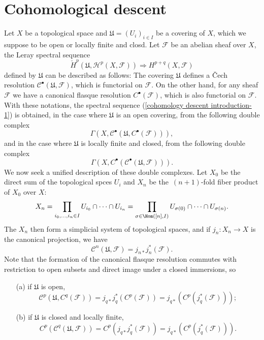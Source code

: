 \section{Cohomological descent}
Let $X$ be a topological space and $\mathfrak{U}=(U_i)_{i\in I}$ be a covering of $X$, which we suppose to be open or locally finite and closd. Let $\mathscr{F}$ be an abelian sheaf over $X$, the Leray spectral sequence
\begin{equation}\label{cohomology descent introduction-1}
\check{H}^p(\mathfrak{U},\mathcal{H}^p(X,\mathscr{F}))\Rightarrow H^{p+q}(X,\mathscr{F})
\end{equation}
defined by $\mathfrak{U}$ can be described as follows: The covering $\mathfrak{U}$ defines a \v{C}ech resolution $\mathscr{C}^\bullet(\mathfrak{U},\mathscr{F})$, which is functorial on $\mathscr{F}$. On the other hand, for any sheaf $\mathscr{F}$ we have a canonical flasque resolution $C^\bullet(\mathscr{F})$, which is also functorial on $\mathscr{F}$. With these notations, the spectral sequence (\ref{cohomology descent introduction-1}) is obtained, in the case where $\mathfrak{U}$ is an open covering, from the following double complex
\[\Gamma(X,\mathscr{C}^\bullet(\mathfrak{U},C^\bullet(\mathscr{F}))),\]
and in the case where $\mathfrak{U}$ is locally finite and closed, from the following double complex
\[\Gamma(X,C^\bullet(\mathscr{C}^\bullet(\mathfrak{U},\mathscr{F}))).\]
We now seek a unified description of these double complexes. Let $X_0$ be the direct sum of the topological spces $U_i$ and $X_n$ be the~$(n+1)$-fold fiber product of $X_0$ over $X$:
\begin{equation}\label{cohomology descent introduction-2}
X_n=\prod_{i_0,\dots,i_n\in I}U_{i_0}\cap\cdots\cap U_{i_n}=\prod_{\sigma\in\Hom([n],I)}U_{\sigma(0)}\cap\cdots\cap U_{\sigma(n)}.
\end{equation}
The $X_n$ then form a simplicial system of topological spaces, and if $j_n:X_n\to X$ is the canonical projection, we have 
\begin{equation}\label{cohomology descent introduction-3}
\mathscr{C}^n(\mathfrak{U},\mathscr{F})=j_{n*}j_n^*(\mathscr{F}).
\end{equation}
Note that the formation of the canonical flasque resolution commutes with restriction to open subsets and direct image under a closed immersions, so
\begin{enumerate}
\item[(a)] if $\mathfrak{U}$ is open, 
\[\mathscr{C}^p(\mathfrak{U},C^q(\mathscr{F}))=j_{q*}j_q^*(C^p(\mathscr{F}))=j_{q*}(C^p(j_q^*(\mathscr{F})));\]
\item[(b)] if $\mathfrak{U}$ is closed and locally finite,
\[C^p(\mathscr{C}^q(\mathfrak{U},\mathscr{F}))=C^p(j_{q*}j_q^*(\mathscr{F}))=j_{q*}(C^p(j_q^*(\mathscr{F}))).\]
\end{enumerate}
